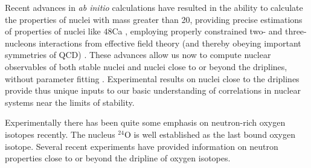 \documentclass[prc,preprint,superscriptaddress,showpacs,floatfix]{revtex4-1}
\begin{document}
Recent advances in {\em ab initio} calculations have resulted in the
ability to calculate the properties of nuclei with mass greater than
20, providing precise estimations of properties of nuclei like
${48}$Ca \cite{naturephysics2015}, employing properly constrained two-
and three-nucleons interactions from effective field theory (and
thereby obeying important symmetries of QCD) \cite{ekstrom2015}. These
advances allow us now to compute nuclear observables of both stable
nuclei and nuclei close to or beyond the driplines, without parameter
fitting \cite{physicascripta2016}. Experimental results on nuclei
close to the driplines provide thus unique inputs to our basic
understanding of correlations in nuclear systems near the limits of
stability.

Experimentally there has been quite some emphasis on neutron-rich oxygen isotopes recently.
The nucleus $^{24}$O is well established as the last bound oxygen isotope. Several recent experiments have provided information
on neutron properties close to or beyond the dripline of oxygen isotopes.
\end{document}
